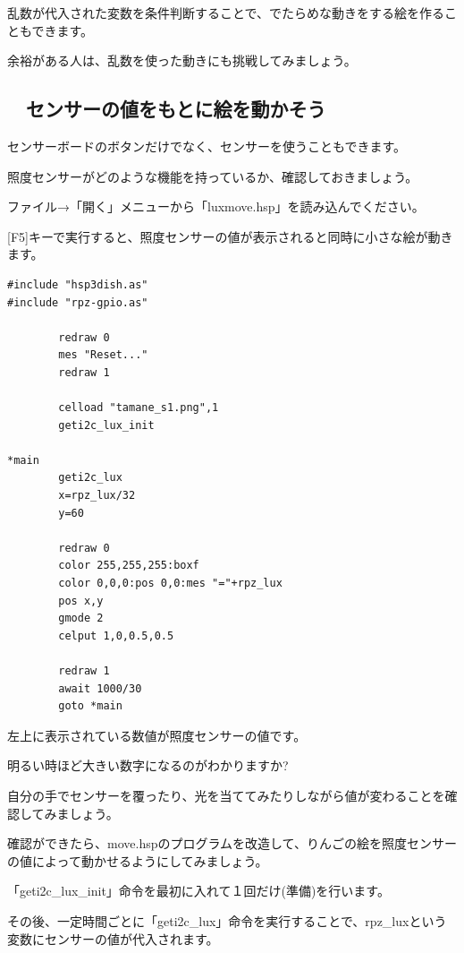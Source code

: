 \documentclass[text04.tex]{subfiles}
\begin{document}
乱数が代入された変数を条件判断することで、でたらめな動きをする絵を作ることもできます。

余裕がある人は、乱数を使った動きにも挑戦してみましょう。

\newpage
\subsection{\useOmetoiExample　センサーの値をもとに絵を動かそう}

\exampleinduction

センサーボードのボタンだけでなく、センサーを使うこともできます。

照度センサーがどのような機能を持っているか、確認しておきましょう。


ファイル→「開く」メニューから「luxmove.hsp」を読み込んでください。

[F5]キーで実行すると、照度センサーの値が表示されると同時に小さな絵が動きます。

\begin{lstlisting}[caption=luxmove.hspのプログラム]
#include "hsp3dish.as"
#include "rpz-gpio.as"

        redraw 0
        mes "Reset..."
        redraw 1

        celload "tamane_s1.png",1
        geti2c_lux_init

*main
        geti2c_lux
        x=rpz_lux/32
        y=60

        redraw 0
        color 255,255,255:boxf
        color 0,0,0:pos 0,0:mes "="+rpz_lux
        pos x,y
        gmode 2
        celput 1,0,0.5,0.5

        redraw 1
        await 1000/30
        goto *main
\end{lstlisting}

左上に表示されている数値が照度センサーの値です。

明るい時ほど大きい数字になるのがわかりますか?

自分の手でセンサーを覆ったり、光を当ててみたりしながら値が変わることを確認してみましょう。

確認ができたら、move.hspのプログラムを改造して、りんごの絵を照度センサーの値によって動かせるようにしてみましょう。


\exampleanswer


「geti2c\_lux\_init」命令を最初に入れて１回だけ(準備)を行います。

その後、一定時間ごとに「geti2c\_lux」命令を実行することで、rpz\_luxという変数にセンサーの値が代入されます。
\end{document}
